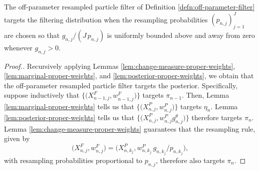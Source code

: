 \documentclass[11pt]{article}
\theoremstyle{thmstylethree}%
\begin{document}
\begin{thm}
    \label{thm:off-parameter-targeting}
    The off-parameter resampled particle filter of Definition \ref{defn:off-parameter-filter} targets the filtering distribution when the resampling probabilities $(p_{n,j})_{j=1}^J$ are chosen so that $g_{n,j}/(J\, p_{n,j})$ is uniformly bounded above and away from zero whenever $g_{n,j}>0$.
\end{thm}
\begin{proof}[Proof.]
    Recursively applying Lemmas \ref{lem:change-measure-proper-weights}, \ref{lem:marginal-proper-weights}, and \ref{lem:posterior-proper-weights}, we obtain that the off-parameter resampled particle filter targets the posterior.
    Specifically, suppose inductively that $\big\{\big(X^{F}_{n-1,j},w^{F}_{n-1,j}\big)\big\}$ targets $\pi_{n-1}$.
    Then, Lemma \ref{lem:marginal-proper-weights} tells us that $\big\{\big(X^{P}_{n,j},w^{P}_{n,j}\big)\big\}$ targets $\eta_n$.
    Lemma \ref{lem:posterior-proper-weights} tells us that $\big\{\big(X^{P}_{n,j},w^{P}_{n,j} g^\theta_{n,j} \big)\big\}$ therefore targets  $\pi_n$.
    Lemma \ref{lem:change-measure-proper-weights} guarantees that the resampling rule, given by 
    \begin{equation}
    \big(X^{F}_{n,j},w^{F}_{n,j}\big) = \big(X^{P}_{n,k_j}, w^{P}_{n,k_j} \, g_{n,k_j}\big/ p_{n,k_j}\big),
    \end{equation}
    with resampling probabilities proportional to $p_{n,j}$, therefore also targets $\pi_n$.
\end{proof}
\end{document}

